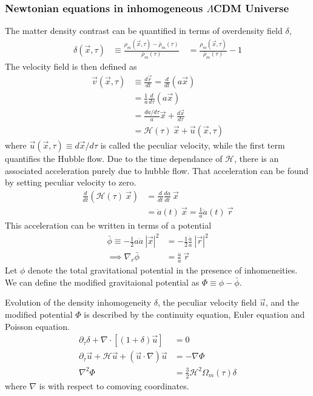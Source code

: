 \documentclass[12pt]{article}
\begin{document}
\subsubsection{Newtonian equations in inhomogeneous $\Lambda$CDM Universe}
The matter density contrast can be quantified in terms of overdensity field $\delta$,
\begin{align}
\delta (\vec{x}, \tau) &\equiv \frac{{\rho}_{m} (\vec{x}, \tau) -\bar{\rho}_{m} (\tau) }{\bar{\rho}_{m} (\tau)} \quad
= \frac{{\rho}_{m} (\vec{x}, \tau) }{\bar{\rho}_{m} (\tau)} - 1
\end{align}
The velocity field is then defined as
\begin{align}
\vec{v} (\vec{x}, \tau) &\equiv \frac{d \vec{r}}{dt} = \frac{d }{dt} (a \vec{x})\\
&= \frac{1}{a} \frac{d }{d \tau} (a \vec{x})\\
&= \frac{da/d \tau}{a} \vec{x} + \frac{d \vec{x}}{d \tau}\\
&= \mathcal{H} (\tau) ~\vec{x} + \vec{u} (\vec{x}, \tau)
\end{align}
where $\vec{u} (\vec{x}, \tau) \equiv d \vec{x} / d\tau$ is called the peculiar velocity, while the first term quantifies the Hubble flow. Due to the time dependance of $\mathcal{H}$, there is an associated acceleration purely due to hubble flow. That acceleration can be found by setting peculiar velocity to zero. 
\begin{align}
\frac{d}{dt} \left( \mathcal{H} (\tau) ~\vec{x} \right) &= \frac{d}{dt} \frac{da}{dt}  ~\vec{x}\\
&= \ddot{a}(t) ~\vec{x} = \frac{1}{a} \ddot{a}(t) ~\vec{r}
\end{align}
This acceleration can be written in terms of a potential
\begin{align}
\bar{\phi} \equiv - \frac{1}{2} a \ddot{a} ~\left| \vec{x}\right| ^2 &= - \frac{1}{2} \frac{\ddot{a}}{a} ~\left| \vec{r}\right| ^2\\
\implies \nabla_{r} \bar{\phi} &= \frac{\ddot{a}}{a} ~\vec{r}
\end{align}
Let $\phi$ denote the total gravitational potential in the presence of inhomeneities. We can define the modified gravitaional potential as $\Phi \equiv \phi - \bar{\phi}$.

Evolution of the density inhomogeneity $\delta$, the peculiar velocity field  $\vec{u}$, and the modified potential $\Phi$ is described by the continuity equation, Euler equation and Poisson equation.
\begin{align}
\partial_{\tau} \delta + \nabla \cdot \left[ (1+ \delta) \vec{u} \right] &= 0\\
\partial_{\tau} \vec{u} + \mathcal{H} \vec{u} + \left( \vec{u} \cdot \nabla \right)  \vec{u} &= - \nabla \Phi\\
\nabla^2 \Phi &= \frac{3}{2} \mathcal{H}^2 \Omega_{m}(\tau) \delta
\end{align}
where $\nabla$ is with respect to comoving coordinates.
\end{document}

